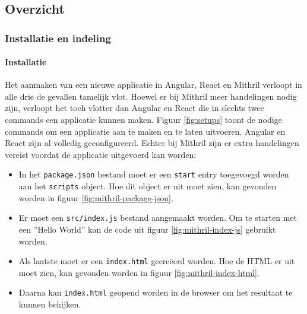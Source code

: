 
\chapter{}
\label{ch:methodologie}




\section{Overzicht}

\subsection{Installatie en indeling}

\subsubsection{Installatie}

Het aanmaken van een nieuwe applicatie in Angular, React en Mithril verloopt in alle drie de gevallen tamelijk vlot. Hoewel er bij Mithril meer handelingen nodig zijn, verloopt het toch vlotter dan Angular en React die in slechts twee commands een applicatie kunnen maken. Figuur \ref{fig:setups} toont de nodige commands om een applicatie aan te maken en te laten uitvoeren.  Angular en React zijn al volledig geconfigureerd. Echter bij Mithril zijn er extra handelingen vereist voordat de applicatie uitgevoerd kan worden:

\begin{itemize}
    \item In het \texttt{package.json} bestand moet er een \texttt{start} entry toegevoegd worden aan het \texttt{scripts} object. Hoe dit object er uit moet zien, kan gevonden worden in figuur \ref{fig:mithril-package-json}.
    \item Er moet een \texttt{src/index.js} bestand aangemaakt worden. Om te starten met een ''Hello World'' kan de code uit figuur \ref{fig:mithril-index-js} gebruikt worden.
    \item Als laatste moet er een \texttt{index.html} gecreëerd worden. Hoe de HTML er uit moet zien, kan gevonden worden in figuur \ref{fig:mithril-index-html}.
    \item Daarna kan \texttt{index.html} geopend worden in de browser om het resultaat te kunnen bekijken.
\end{itemize}

